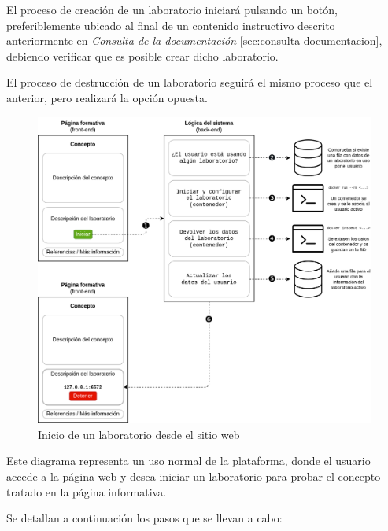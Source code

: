             El proceso de creación de un laboratorio iniciará pulsando un botón, preferiblemente ubicado al final de un contenido instructivo descrito anteriormente en \textit{Consulta de la documentación} \ref{sec:consulta-documentacion}, debiendo verificar que es posible crear dicho laboratorio.
            
            El proceso de destrucción de un laboratorio seguirá el mismo proceso que el anterior, pero realizará la opción opuesta.

            \newpage


            \begin{figure}[h]
                \centering

                \includegraphics[scale=0.125]{images/Diagramas/iniciar.png}
                \caption{Inicio de un laboratorio desde el sitio web}
                    \label{fig:inicio-laboratorio}
            \end{figure}

            Este diagrama representa un uso normal de la plataforma, donde el usuario accede a la página web y desea iniciar un laboratorio para probar el concepto tratado en la página informativa.

            Se detallan a continuación los pasos que se llevan a cabo:

